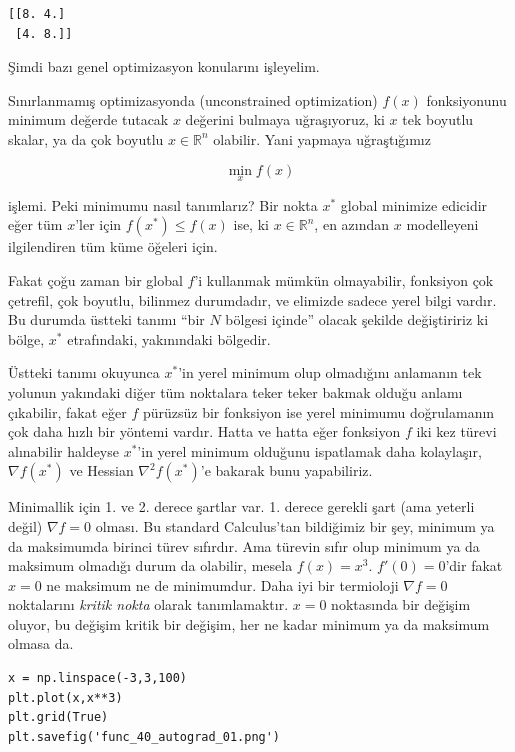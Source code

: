 \documentclass[12pt,fleqn]{article}\usepackage{../../common}
\begin{document}
\begin{verbatim}
[[8. 4.]
 [4. 8.]]
\end{verbatim}

Şimdi bazı genel optimizasyon konularını işleyelim. 

Sınırlanmamış optimizasyonda (unconstrained optimization) $f(x)$
fonksiyonunu minimum değerde tutacak $x$ değerini bulmaya uğraşıyoruz, ki
$x$ tek boyutlu skalar, ya da çok boyutlu $x \in \mathbb{R}^n$
olabilir. Yani yapmaya uğraştığımız

$$
\min_x f(x)
$$

işlemi. Peki minimumu nasıl tanımlarız? Bir nokta $x^\ast$ global minimize
edicidir eğer tüm $x$'ler için $f(x^\ast) \le f(x)$ ise, ki
$x \in \mathbb{R}^n$, en azından $x$ modelleyeni ilgilendiren tüm küme
öğeleri için.

Fakat çoğu zaman bir global $f$'i kullanmak mümkün olmayabilir, fonksiyon
çok çetrefil, çok boyutlu, bilinmez durumdadır, ve elimizde sadece yerel
bilgi vardır. Bu durumda üstteki tanımı ``bir $N$ bölgesi içinde'' olacak
şekilde değiştiririz ki bölge, $x^\ast$ etrafındaki, yakınındaki bölgedir.

Üstteki tanımı okuyunca  $x^\ast$'in yerel minimum olup olmadığını anlamanın
tek yolunun yakındaki diğer tüm noktalara teker teker bakmak olduğu anlamı
çıkabilir, fakat eğer $f$ pürüzsüz bir fonksiyon ise yerel minimumu
doğrulamanın çok daha hızlı bir yöntemi vardır. Hatta ve hatta eğer
fonksiyon $f$ iki kez türevi alınabilir haldeyse $x^\ast$'in yerel minimum
olduğunu ispatlamak daha kolaylaşır, $\nabla f(x^\ast)$ ve Hessian $\nabla^2
f(x^\ast)$'e bakarak bunu yapabiliriz.

Minimallik için 1. ve 2. derece şartlar var. 1. derece gerekli şart (ama
yeterli değil) $\nabla f = 0$ olması. Bu standard Calculus'tan bildiğimiz
bir şey, minimum ya da maksimumda birinci türev sıfırdır. Ama türevin sıfır
olup minimum ya da maksimum olmadığı durum da olabilir, mesela
$f(x) = x^3$. $f'(0) = 0$'dir fakat $x=0$ ne maksimum ne de
minimumdur. Daha iyi bir termioloji $\nabla f = 0$ noktalarını {\em kritik
  nokta} olarak tanımlamaktır. $x=0$ noktasında bir değişim oluyor, bu
değişim kritik bir değişim, her ne kadar minimum ya da maksimum olmasa da.

\begin{verbatim}
x = np.linspace(-3,3,100)
plt.plot(x,x**3)
plt.grid(True)
plt.savefig('func_40_autograd_01.png')
\end{verbatim}
\end{document}

